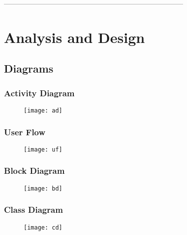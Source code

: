  ------------------------------------------------------------------------------
\chapter{Analysis and Design} %
\cleardoublepage{}
\section{Diagrams} %

\subsection{Activity Diagram}
\begin{figure}[h]
    \begin{center}
\texttt{[image: ad]}
    \end{center}
\centering
\end{figure}
\newpage
\subsection{User Flow}
\begin{figure}[h]
    \begin{center}
\texttt{[image: uf]}
\end{center}
\centering
\end{figure}

\newpage
\subsection{Block Diagram}
\begin{figure}[h]
    \begin{center}
        \texttt{[image: bd]}
    \end{center}
\centering
\end{figure}

\newpage
\subsection{Class Diagram}
\begin{figure}[h]
    \begin{center}
        \texttt{[image: cd]}
    \end{center}
\centering
\end{figure}

